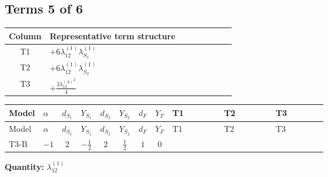 \documentclass[8pt]{article}
\begin{document}
\begin{landscape}
\subsection*{Terms 5 of 6}
\begin{center}
\begin{tabular}{@{}c >{\raggedright\arraybackslash}p{0.82\linewidth}@{}}
\toprule
Column & Representative term structure \\
\midrule
T1 & \(\displaystyle +6 {\lambda_{12}^{(1)}} {\lambda_{S_1}^{(1)}}\) \\
\midrule
T2 & \(\displaystyle +6 {\lambda_{12}^{(1)}} {\lambda_{S_2}^{(1)}}\) \\
\midrule
T3 & \(\displaystyle +\frac{3 {\lambda_{12}^{(A)}}^2}{4}\) \\
\midrule
\bottomrule
\end{tabular}
\end{center}
\smallskip
\tiny
\begin{longtable}{@{}llcccccc >{\raggedright\arraybackslash}p{0.21\linewidth} >{\raggedright\arraybackslash}p{0.21\linewidth} >{\raggedright\arraybackslash}p{0.21\linewidth}@{}}
\toprule
Model & $\alpha$ & $d_{S_1}$ & $Y_{S_1}$ & $d_{S_2}$ & $Y_{S_2}$ & $d_F$ & $Y_F$ & T1 & T2 & T3 \\
\midrule
\endfirsthead
\toprule
Model & $\alpha$ & $d_{S_1}$ & $Y_{S_1}$ & $d_{S_2}$ & $Y_{S_2}$ & $d_F$ & $Y_F$ & T1 & T2 & T3 \\
\midrule
\endhead
T3-B & $-1$ & $2$ & $-\frac{1}{2}$ & $2$ & $\frac{1}{2}$ & $1$ & $0$ & \scriptsize\adjustbox{max width=\linewidth}{$\begin{gathered} +6 {\lambda_{12}^{(1)}} {\lambda_{S_1}^{(1)}}\end{gathered}$} & \scriptsize\adjustbox{max width=\linewidth}{$\begin{gathered} +6 {\lambda_{12}^{(1)}} {\lambda_{S_2}^{(1)}}\end{gathered}$} & \scriptsize\adjustbox{max width=\linewidth}{$\begin{gathered} +\frac{3 {\lambda_{12}^{(A)}}^2}{4}\end{gathered}$} \\
\midrule
\bottomrule
\end{longtable}
\clearpage
\noindent\textbf{Quantity: }$\lambda_{12}^{(1)}$\par\smallskip

\end{landscape}
\end{document}
